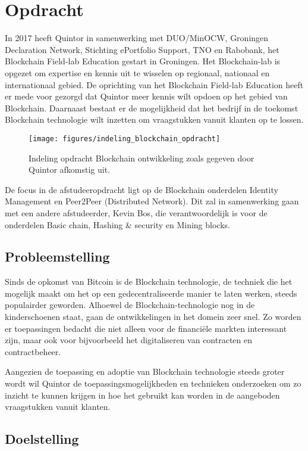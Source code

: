 \chapter{Opdracht}

In 2017 heeft Quintor in samenwerking met DUO/MinOCW, Groningen Declaration Network, Stichting ePortfolio Support, TNO en Rabobank, het Blockchain Field-lab Education gestart in Groningen. Het Blockchain-lab is opgezet om expertise en kennis uit te wisselen op regionaal, nationaal en internationaal gebied. De oprichting van het Blockchain Field-lab Education heeft er mede voor gezorgd dat Quintor meer kennis wilt opdoen op het gebied van Blockchain. Daarnaast bestaat er de mogelijkheid dat het bedrijf in de toekomst Blockchain technologie wilt inzetten om vraagstukken vanuit klanten op te lossen.

\begin{figure}[h]
  \centering
  \texttt{[image: figures/indeling\_blockchain\_opdracht]}
  \caption{Indeling opdracht Blockchain ontwikkeling zoals gegeven door Quintor afkomstig uit.}
  \label{indeling_blockchain_opdracht} 
\end{figure}

De focus in de afstudeeropdracht ligt op de Blockchain onderdelen Identity Management en Peer2Peer (Distributed Network). Dit zal in samenwerking gaan met een andere afstudeerder, Kevin Bos, die verantwoordelijk is voor de onderdelen Basic chain, Hashing \& security en Mining blocks. 

\newpage
\section{Probleemstelling}

Sinds de opkomst van Bitcoin is de Blockchain technologie, de techniek die het mogelijk maakt om het op een gedecentraliseerde manier te laten werken, steeds populairder geworden. Alhoewel de Blockchain-technologie nog in de kinderschoenen staat, gaan de ontwikkelingen in het domein zeer snel. Zo worden er toepassingen bedacht die niet alleen voor de financiële markten interessant zijn, maar ook voor bijvoorbeeld het digitaliseren van contracten en contractbeheer.

Aangezien de toepassing en adoptie van Blockchain technologie steeds groter wordt wil Quintor de toepassingsmogelijkheden en technieken onderzoeken om zo inzicht te kunnen krijgen in hoe het gebruikt kan worden in de aangeboden vraagstukken vanuit klanten.

\section{Doelstelling}

